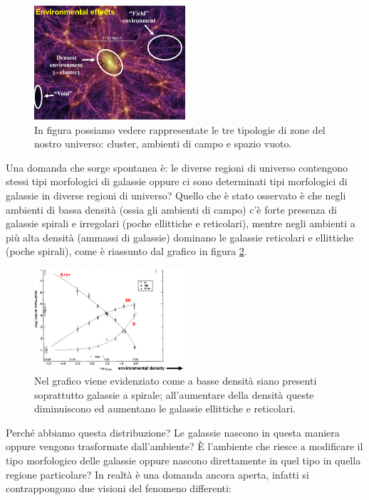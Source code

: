 \begin{figure}
	\centering
	\includegraphics[width = 0.5\textwidth]{immagini/non-nomogeneita-universo.png}
	\caption{In figura possiamo vedere rappresentate le tre tipologie di zone del nostro universo: cluster, ambienti di campo e spazio vuoto.}
	\label{fig:non-omogeneo-universo}
\end{figure}

Una domanda che sorge spontanea è: le diverse regioni di universo contengono stessi tipi morfologici di galassie oppure ci sono determinati tipi morfologici di galassie in diverse regioni di universo? Quello che è stato osservato è che negli ambienti di bassa densità (ossia gli ambienti di campo) c’è forte presenza di galassie spirali e irregolari (poche ellittiche e reticolari), mentre negli ambienti a più alta densità (ammassi di galassie) dominano le galassie reticolari e ellittiche (poche spirali), come è riassunto dal grafico in figura \ref{fig:grafico-densità-morfologia}.

\begin{figure}[!htb]
	\centering
	\includegraphics[width = 0.5\textwidth]{immagini/enviromental-density.png}
	\caption{Nel grafico viene evidenziato come a basse densità siano presenti soprattutto galassie a spirale; all'aumentare della densità queste diminuiscono ed aumentano le galassie ellittiche e reticolari.}
	\label{fig:grafico-densità-morfologia}
\end{figure}

Perché abbiamo questa distribuzione? Le galassie nascono in questa maniera oppure vengono trasformate dall’ambiente? È l’ambiente che riesce a modificare il tipo morfologico delle galassie oppure nascono direttamente in quel tipo in quella regione particolare? In realtà è una domanda ancora aperta, infatti si contrappongono due visioni del fenomeno differenti:

